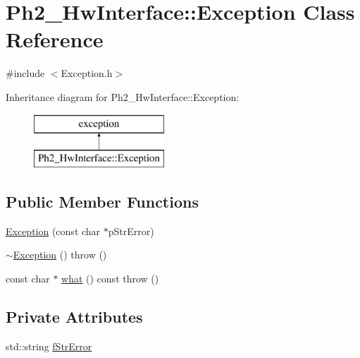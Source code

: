 \hypertarget{class_ph2___hw_interface_1_1_exception}{\section{Ph2\-\_\-\-Hw\-Interface\-:\-:Exception Class Reference}
\label{class_ph2___hw_interface_1_1_exception}
}


{\ttfamily \#include $<$Exception.\-h$>$}

Inheritance diagram for Ph2\-\_\-\-Hw\-Interface\-:\-:Exception\-:\begin{figure}[H]
\begin{center}
\leavevmode
\includegraphics[height=2.000000cm]{class_ph2___hw_interface_1_1_exception}
\end{center}
\end{figure}
\subsection*{Public Member Functions}
\begin{DoxyCompactItemize}
\item 
\hyperlink{class_ph2___hw_interface_1_1_exception_a9ac7df51fe36dfb65ff24ca975ec846f}{Exception} (const char $\ast$p\-Str\-Error)
\item 
\hyperlink{class_ph2___hw_interface_1_1_exception_a667217cdbe920cb69842a3d3afb69d35}{$\sim$\-Exception} ()  throw ()
\item 
const char $\ast$ \hyperlink{class_ph2___hw_interface_1_1_exception_a8db77fef785111589956a21598b748e0}{what} () const   throw ()
\end{DoxyCompactItemize}
\subsection*{Private Attributes}
\begin{DoxyCompactItemize}
\item 
std\-::string \hyperlink{class_ph2___hw_interface_1_1_exception_aa060af06e0614e117e2902f41e57e179}{f\-Str\-Error}
\end{DoxyCompactItemize}


